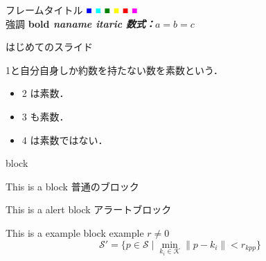 \documentclass[dvipdfmx, a4p, cjk]{beamer}
\newcommand{\red}[1]{\textcolor{red}{#1}}
\newcommand{\green}[1]{\textcolor{green}{#1}}
\newcommand{\blue}[1]{\textcolor{blue}{#1}}
\newcommand{\cyan}[1]{\textcolor{cyan}{#1}}
\newcommand{\magenta}[1]{\textcolor{magenta}{#1}}
\newcommand{\yellow}[1]{\textcolor{yellow}{#1}}
\begin{document}
\begin{frame}{フレームタイトル}
\blue{■} \hspace{-9pt} \cyan{■} \hspace{-9pt} \green{■} \hspace{-9pt} \yellow{■} \hspace{-9pt} \red{■} \hspace{-9pt} \magenta{■} \vspace{ 0pt}\\

\alert{強調}
\bf{bold}
\sl{naname}
\it{itaric}
数式：$a=b=c$

\end{frame}

\begin{frame}{はじめてのスライド}
    \begin{definition}
    1と自分自身しか約数を持たない数を\alert{素数}という．
    \end{definition}
    \begin{example}
        \begin{itemize}
        \item 2 は素数．
        \item 3 も素数．
        \item 4 は素数ではない．
        \end{itemize}
    \end{example}
\end{frame}

\begin{frame}{block}
    \begin{block}{This is a block}
        普通のブロック
    \end{block}
    \begin{alertblock}{This is a alert block}
        アラートブロック
    \end{alertblock}
    \begin{exampleblock}{This is a example block}
        example
        $r \neq 0$
        \[ \mathcal{S}' = \{ p \in \mathcal{S} \mid \min_{k_i \in \mathcal{K}} \|p - k_i\| < r_{kpp} \} \]
    \end{exampleblock}
\end{frame}
\end{document}
